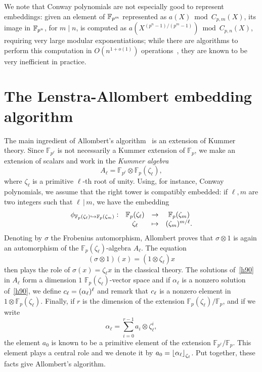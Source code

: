 \documentclass{sig-alternate}
\begin{document}
We note that Conway polynomials are not especially good to represent
embeddings: given an element of $\mathbb{F}_{p^m}$ represented as
$a(X) \bmod C_{p,m}(X)$, its image in $\mathbb{F}_{p^n}$, for $m\mid n$, is
computed as $a(X^{(p^n-1)/(p^m-1)})\bmod C_{p,n}(X)$, requiring very
large modular exponentiations; while there are algorithms to perform
this computation in $O(n^{1+o(1)})$ operations~\cite{KeUm11}, they are
known to be very inefficient in practice. %


\section{The Lenstra-Allombert embedding algorithm}
\label{sec:lenstra}
\cite{LenstraJr91}\cite{brieulle2018computing}


The main ingredient of Allombert's algorithm~\cite{Allombert02} is an extension
of Kummer theory. Since $\mathbb{F}_{p^\ell}$ is not necessarily a Kummer
extension of $\mathbb{F}_p$, we make an extension of scalars and work in the
\emph{Kummer algebra}
\[
  A_\ell = \mathbb{F}_{p^\ell}\otimes\mathbb{F}_{p}(\zeta_\ell),
\]
where $\zeta_\ell$ is a primitive $\ell$-th root of unity. Using, for instance,
Conway polynomials, we assume that the right tower is compatibly embedded: if
$\ell, m$ are two integers such that $\ell\,|\,m$, we have the embedding
\[
\begin{array}{cccc}
  \phi_{\mathbb{F}_{p}(\zeta_{\ell})\hookrightarrow\mathbb{F}_{p}(\zeta_{m})}: & \mathbb{F}_{p}(\zeta_\ell) & \to & \mathbb{F}_{p}(\zeta_m) \\
  & \zeta_\ell & \mapsto & (\zeta_{m})^{m/\ell}.
\end{array}
\]
Denoting by $\sigma$ the Frobenius automorphism, Allombert proves that
$\sigma\otimes1$ is again an automorphism of the
$\mathbb{F}_{p}(\zeta_\ell)$-algebra $A_\ell$. The equation
\begin{equation}
  \tag{H90}
 (\sigma\otimes1)(x) = (1\otimes\zeta_\ell)x
  \label{h90}
\end{equation}
then plays the role of $\sigma(x)=\zeta_\ell x$ in the classical theory. The
solutions of~\eqref{h90} in $A_\ell$ form a dimension $1$
$\mathbb{F}_{p}(\zeta_{\ell})$-vector space and if $\alpha_\ell$ is a
nonzero solution
of~\eqref{h90}, we define $c_\ell = (\alpha_\ell)^\ell$ and remark that
$c_\ell$ is a nonzero element in $1\otimes\mathbb{F}_{p}(\zeta_\ell)$. Finally,
if $r$ is the dimension of the extension
$\mathbb{F}_{p}(\zeta_\ell)/\mathbb{F}_p$, and if we write
\[
  \alpha_\ell = \sum_{i =  0}^{r-1}a_i\otimes\zeta_{\ell}^i,
\]
the element $a_0$ is known to be a primitive element of the extension
$\mathbb{F}_{p^\ell}/\mathbb{F}_{p}$. This element plays a central role and we
denote it by $a_0 = \left\lfloor \alpha_\ell \right\rfloor_{\zeta_\ell}$. Put together, these facts give Allombert's
algorithm.
\end{document}
